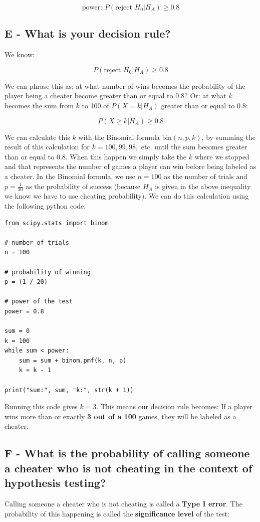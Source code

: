 \documentclass[12pt]{article}
\begin{document}
\[ \text{power: } P(\text{reject } H_0 | H_A) \geq 0.8 \]

\subsection*{E - What is your decision rule?}
We know:

\[ P(\text{reject } H_0 | H_A) \geq 0.8 \]

\noindent
We can phrase this as: at what number of wins becomes the probability of the player being a cheater become greater than or equal to 0.8?
Or: at what $k$ becomes the sum from $k$ to 100 of $P(X = k | H_A)$ greater than or equal to 0.8:

\[ P(X \geq k | H_A) \geq 0.8 \]

\noindent
We can calculate this $k$ with the Binomial formula bin$(n, p, k)$, by summing the result of this calculation for $k = 100, 99, 98, $ etc. until the sum becomes greater than or equal to 0.8.
When this happen we simply take the $k$ where we stopped and that represents the number of games a player can win before being labeled as a cheater.
In the Binomial formula, we use $n = 100$ as the number of trials and $p = \frac{1}{20}$ as the probability of success (because $H_A$ is given in the above inequality we know we have to use cheating probability).
We can do this calculation using the following python code:

\newpage
\begin{verbatim}
from scipy.stats import binom

# number of trials
n = 100
    
# probability of winning
p = (1 / 20)
    
# power of the test
power = 0.8
    
sum = 0
k = 100
while sum < power:
    sum = sum + binom.pmf(k, n, p)
    k = k - 1
        
print("sum:", sum, "k:", str(k + 1))
\end{verbatim}

\noindent
Running this code gives $k = 3$.
This means our decision rule becomes:
If a player wins more than or exactly \textbf{3 out of a 100} games, they will be labeled as a cheater.

\subsection*{F - What is the probability of calling someone a cheater who is not cheating in the context of hypothesis testing?}
Calling someone a cheater who is not cheating is called a \textbf{Type I error}.
The probability of this happening is called the \textbf{significance level} of the test:
\end{document}
